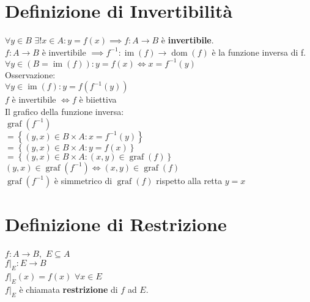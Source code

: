 \documentclass[a4paper, twoside, italian, 11pt]{book}
\newcommand{\braces}[1] {\left \{ #1 \right \}}
\DeclareMathOperator{\dom}{dom}
\DeclareMathOperator{\im}{im}
\DeclareMathOperator{\graf}{graf}
\begin{document}
\section{Definizione di Invertibilità}

\noindent
$\forall y \in B$ $\exists! x \in A : y = f(x) \implies f : A \rightarrow B$ è \textbf{invertibile}. \\

\noindent
$f : A \rightarrow B$ è invertibile $\implies f^{-1} : \im(f) \rightarrow \dom(f)$ è la funzione inversa di f. \\

\noindent
$\forall y \in (B = \im(f)) : y = f(x) \iff x = f^{-1}(y)$ \\

\noindent
Osservazione: \\

\noindent
$\forall y \in \im(f) : y = f(f^{-1}(y))$ \\

\noindent
$f$ è invertibile $\iff f$ è biiettiva \\

\noindent
Il grafico della funzione inversa: \\
$\graf(f^{-1})$ \\
$= \braces{(y, x) \in B \times A : x = f^{-1}(y)}$ \\
$= \braces{(y, x) \in B \times A : y = f(x)}$ \\
$= \braces{(y, x) \in B \times A : (x, y) \in \graf(f)}$ \\

\noindent
$(y, x) \in \graf(f^{-1}) \iff (x, y) \in \graf(f)$ \\

\noindent
$\graf(f^{-1})$ è simmetrico di $\graf(f)$ rispetto alla retta $y = x$



\section{Definizione di Restrizione}

\noindent
$f : A \rightarrow B,$ $E \subseteq A$ \\

\noindent
$f|_E : E \rightarrow B$ \\
$f|_E(x) = f(x)$ $\forall x \in E$ \\

\noindent
$f|_E$ è chiamata \textbf{restrizione} di $f$ ad $E$. \\
\end{document}
